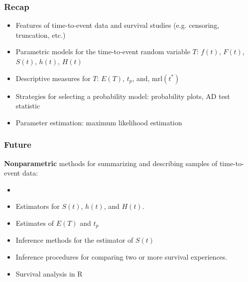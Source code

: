 \begin{frame}
\frametitle{Recap}
\begin{itemize}
\item Features of time-to-event data and survival studies (e.g. censoring, truncation, etc.)
\item Parametric models for the time-to-event random variable $T$: $f(t)$, $F(t)$, $S(t)$, $h(t)$, $H(t)$
\item Descriptive measures for $T$: $E(T)$, $t_p$, and, $\mbox{mrl}(t^*)$
\item Strategies for selecting a probability model: probability plots, AD test statistic
\item Parameter estimation: maximum likelihood estimation
\end{itemize}
\end{frame}


\begin{frame}
\frametitle{Future}
\textbf{Nonparametric} methods for summarizing and describing samples of time-to-event data:
\begin{itemize}
\item[]
\item Estimators for $S(t)$, $h(t)$, and $H(t)$.
\item Estimates of $E(T)$ and $t_p$
\item Inference methods for the estimator of $S(t)$
\item Inference procedures for comparing two or more survival experiences.
\item Survival analysis in R
\end{itemize}
\end{frame}

 